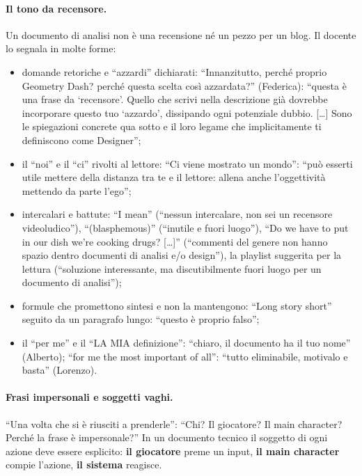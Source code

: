 \paragraph{Il tono da recensore.} Un documento di analisi non è una
recensione né un pezzo per un blog. Il docente lo segnala in molte forme:
\begin{itemize}
  \item domande retoriche e ``azzardi'' dichiarati: ``Innanzitutto, perché
        proprio Geometry Dash? perché questa scelta così azzardata?''
        (Federica): ``questa è una frase da `recensore'. Quello che scrivi
        nella descrizione già dovrebbe incorporare questo tuo `azzardo',
        dissipando ogni potenziale dubbio. [\dots] Sono le spiegazioni
        concrete qua sotto e il loro legame che implicitamente ti definiscono
        come Designer'';
  \item il ``noi'' e il ``ci'' rivolti al lettore: ``Ci viene mostrato un
        mondo'': ``può esserti utile mettere della distanza tra te e il
        lettore: allena anche l'oggettività mettendo da parte l'ego'';
  \item intercalari e battute: ``I mean'' (``nessun intercalare, non sei un
        recensore videoludico''), ``(blasphemous)'' (``inutile e fuori
        luogo''), ``Do we have to put in our dish we're cooking drugs?
        [\dots]'' (``commenti del genere non hanno spazio dentro documenti di
        analisi e/o design''), la playlist suggerita per la lettura
        (``soluzione interessante, ma discutibilmente fuori luogo per un
        documento di analisi'');
  \item formule che promettono sintesi e non la mantengono: ``Long story
        short'' seguito da un paragrafo lungo: ``questo è proprio falso'';
  \item il ``per me'' e il ``LA MIA definizione'': ``chiaro, il documento ha
        il tuo nome'' (Alberto); ``for me the most important of all'':
        ``tutto eliminabile, motivalo e basta'' (Lorenzo).
\end{itemize}

\paragraph{Frasi impersonali e soggetti vaghi.} ``Una volta che si è riusciti
a prenderle'': ``Chi? Il giocatore? Il main character? Perché la frase è
impersonale?'' In un documento tecnico il soggetto di ogni azione deve essere
esplicito: \textbf{il giocatore} preme un input, \textbf{il main character}
compie l'azione, \textbf{il sistema} reagisce.

